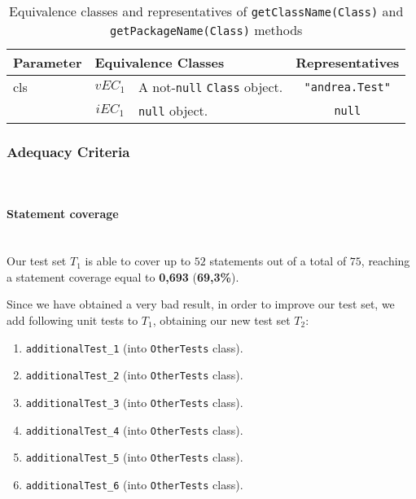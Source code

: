 \documentclass[sigconf]{acmart}
\begin{document}
\begin{table*}
\footnotesize
\caption{Equivalence classes and representatives of \texttt{getClassName(Class)} and  \texttt{getPackageName(Class)} methods}
\label{getClassNameClassGetPackageNameClassEq}
\centering
\begin{tabular}{l|cm{10.5cm}|c}
\toprule
 
\textbf{Parameter} & \multicolumn{2}{|l|}{\textbf{Equivalence Classes}} & \textbf{Representatives} \\
\midrule
    
cls & $vEC_1$ & A not-\texttt{null} \texttt{Class} object. & \texttt{"andrea.Test"}

\\\cline{2-4}

& $iEC_1$ & \texttt{null} object. & \texttt{null}

\\

\bottomrule
\end{tabular}
\end{table*}



\subsubsection{Adequacy Criteria}
\hfill\\

\paragraph{Statement coverage}
\hfill\\

Our test set $T_1$ is able to cover up to $52$ statements out of a total of $75$, reaching a statement coverage equal to \textbf{0,693} (\textbf{69,3\%}). 

Since we have obtained a very bad result, in order to improve our test set, we add following unit tests to $T_1$, obtaining our new test set $T_2$:
\begin{enumerate}
\item\texttt{additionalTest\_1} (into \texttt{OtherTests} class).
\item\texttt{additionalTest\_2} (into \texttt{OtherTests} class).
\item\texttt{additionalTest\_3} (into \texttt{OtherTests} class).
\item\texttt{additionalTest\_4} (into \texttt{OtherTests} class).
\item\texttt{additionalTest\_5} (into \texttt{OtherTests} class).
\item\texttt{additionalTest\_6} (into \texttt{OtherTests} class).
\end{enumerate}
\end{document}
